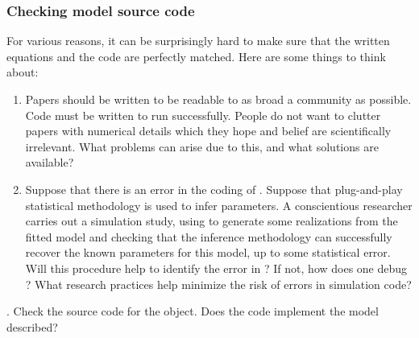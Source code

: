 \documentclass{beamer}\usepackage[]{graphicx}\usepackage[]{color}
\newcommand\answer[2]{#1} %
\begin{document}
\begin{frame}[fragile]
\frametitle{Checking model source code}

For various reasons, it can be surprisingly hard to make sure that the written equations and the code are perfectly matched. Here are some things to think about:

\begin{enumerate}

\item Papers should be written to be readable to as broad a community as possible. Code must be written to run successfully. People do not want to clutter papers with numerical details which they hope and belief are scientifically irrelevant. What problems can arise due to this, and what solutions are available?

\item Suppose that there is an error in the coding of . Suppose that plug-and-play statistical methodology is used to infer parameters.  A conscientious researcher carries out a simulation study, using  to generate some realizations from the fitted model and checking that the inference methodology can successfully recover the known parameters for this model, up to some statistical error. Will this procedure help to identify the error in ? If not, how does one debug ? What research practices help minimize the risk of errors in simulation code?

\end{enumerate}

\end{frame}  

 \begin{frame}[fragile]


\myquestion. Check the source code for the   object. Does the code implement the model described?

\answer{\vspace{50mm}}{todo}
\end{frame}
\end{document}
